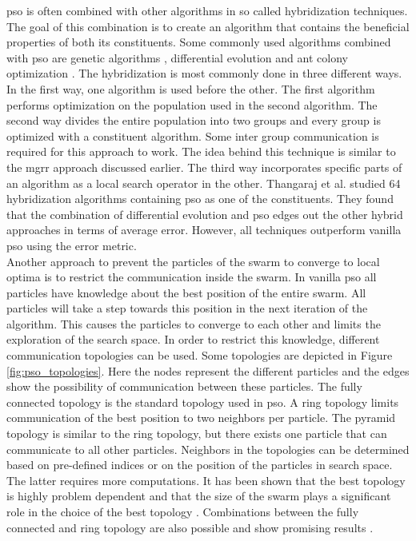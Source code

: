\gls{pso} is often combined with other algorithms in so called hybridization techniques. The goal of this combination is to create an algorithm that contains the beneficial properties of both its constituents. Some commonly used algorithms combined with \gls{pso} are genetic algorithms \cite{genetic_algorithm}, differential evolution \cite{differential_evolution} and ant colony optimization \cite{aco}. The hybridization is most commonly done in three different ways. In the first way, one algorithm is used before the other. The first algorithm performs optimization on the population used in the second algorithm. The second way divides the entire population into two groups and every group is optimized with a constituent algorithm. Some inter group communication is required for this approach to work. The idea behind this technique is similar to the \gls{mgrr} approach discussed earlier. The third way incorporates specific parts of an algorithm as a local search operator in the other. Thangaraj et al. \cite{hybridization_survey} studied 64 hybridization algorithms containing \gls{pso} as one of the constituents. They found that the combination of differential evolution and \gls{pso} edges out the other hybrid approaches in terms of average error. However, all techniques outperform vanilla \gls{pso} using the error metric.\\

Another approach to prevent the particles of the swarm to converge to local optima is to restrict the communication inside the swarm. In vanilla \gls{pso} all particles have knowledge about the best position of the entire swarm. All particles will take a step towards this position in the next iteration of the algorithm. This causes the particles to converge to each other and limits the exploration of the search space. In order to restrict this knowledge, different communication topologies can be used. Some topologies are depicted in Figure \ref{fig:pso_topologies}. Here the nodes represent the different particles and the edges show the possibility of communication between these particles. The fully connected topology is the standard topology used in \gls{pso}. A ring topology limits communication of the best position to two neighbors per particle. The pyramid topology is similar to the ring topology, but there exists one particle that can communicate to all other particles. Neighbors in the topologies can be determined based on pre-defined indices or on the position of the particles in search space. The latter requires more computations. It has been shown that the best topology is highly problem dependent and that the size of the swarm plays a significant role in the choice of the best topology \cite{pso_topologies}. Combinations between the fully connected and ring topology are also possible and show promising results \cite{fc_ring}.
 
